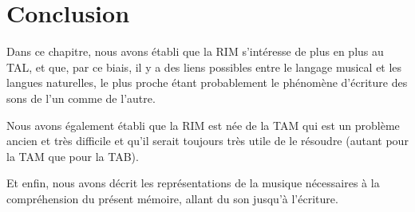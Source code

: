 \section*{Conclusion}
Dans ce chapitre, nous avons établi que la RIM s’intéresse de plus en plus au
TAL, et que, par ce biais, il y a des liens possibles entre le langage musical
et les langues naturelles, le plus proche étant probablement le phénomène
d’écriture des sons de l’un comme de l’autre.

Nous avons également établi que la RIM est née de la TAM qui est un problème
ancien et très difficile et qu’il serait toujours très utile de le résoudre
(autant pour la TAM que pour la TAB).

Et enfin, nous avons décrit les représentations de la musique nécessaires à la
compréhension du présent mémoire, allant du son jusqu’à l’écriture.
